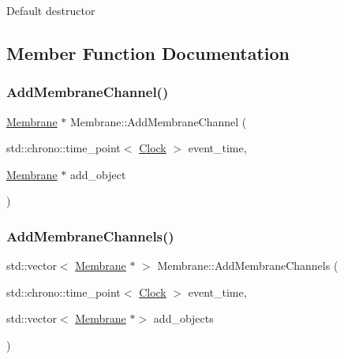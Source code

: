Default destructor 

\subsection{Member Function Documentation}
\mbox{\label{classMembrane_a3e3b4f55f028541e7513f826d01a689a}} 
\subsubsection{\texorpdfstring{Add\+Membrane\+Channel()}{AddMembraneChannel()}}
{\footnotesize\ttfamily \mbox{\hyperlink{classMembrane}{Membrane}} $\ast$ Membrane\+::\+Add\+Membrane\+Channel (\begin{DoxyParamCaption}\item[{std\+::chrono\+::time\+\_\+point$<$ \mbox{\hyperlink{universe_8h_a0ef8d951d1ca5ab3cfaf7ab4c7a6fd80}{Clock}} $>$}]{event\+\_\+time,  }\item[{\mbox{\hyperlink{classMembrane}{Membrane}} $\ast$}]{add\+\_\+object }\end{DoxyParamCaption})}

\mbox{\label{classMembrane_aab591875e3266d6c5af0f7c5f7f21e8f}} 
\subsubsection{\texorpdfstring{Add\+Membrane\+Channels()}{AddMembraneChannels()}}
{\footnotesize\ttfamily std\+::vector$<$ \mbox{\hyperlink{classMembrane}{Membrane}} $\ast$ $>$ Membrane\+::\+Add\+Membrane\+Channels (\begin{DoxyParamCaption}\item[{std\+::chrono\+::time\+\_\+point$<$ \mbox{\hyperlink{universe_8h_a0ef8d951d1ca5ab3cfaf7ab4c7a6fd80}{Clock}} $>$}]{event\+\_\+time,  }\item[{std\+::vector$<$ \mbox{\hyperlink{classMembrane}{Membrane}} $\ast$$>$}]{add\+\_\+objects }\end{DoxyParamCaption})}

\mbox{\label{classMembrane_a9514ca4d4378e6467d2059a9d5f9b99b}} 
